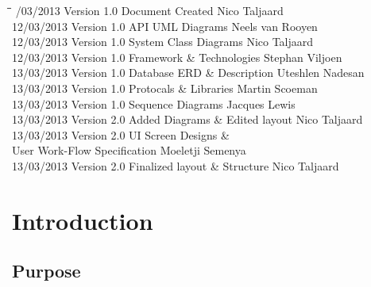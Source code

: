 \documentclass[12pt]{article}
\begin{document}
\begin{tabbing}
\hspace*{2.5cm}\=\hspace*{2.5cm}\=\hspace*{7cm}\=\hspace*{3cm} /03/2013 \> Version 1.0 \> Document Created \> Nico Taljaard\\
12/03/2013 \> Version 1.0 \> API UML Diagrams \> Neels van Rooyen\\
12/03/2013 \> Version 1.0 \> System Class Diagrams \> Nico Taljaard\\
12/03/2013 \> Version 1.0 \> Framework \& Technologies \> Stephan Viljoen\\
13/03/2013 \> Version 1.0 \> Database ERD \& Description \> Uteshlen Nadesan\\
13/03/2013 \> Version 1.0 \> Protocals \& Libraries \> Martin Scoeman\\
13/03/2013 \> Version 1.0 \> Sequence Diagrams \> Jacques Lewis\\
13/03/2013 \> Version 2.0 \> Added Diagrams \& Edited layout \> Nico Taljaard\\
13/03/2013 \> Version 2.0 \> UI Screen Designs \&  \>\\
						\>\> User Work-Flow Specification \> Moeletji Semenya\\
13/03/2013 \> Version 2.0 \> Finalized layout \& Structure \> Nico Taljaard\\

\end{tabbing}

\newpage


\tableofcontents

\newpage


\section{Introduction}

	\subsection{Purpose}
\end{document}

